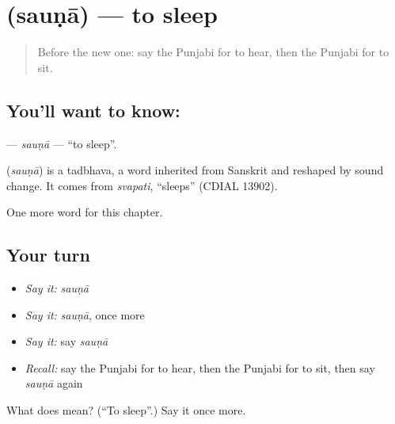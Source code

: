 \section[\texorpdfstring{\pa{ਸੌਣਾ} (sauṇā)}{ਸੌਣਾ (sauṇā)}]{ (sauṇā) — to sleep}

\label{lesson:PA-C56-sauna}



\begin{quote}
Before the new one: say the Punjabi for to hear, then the Punjabi for to sit.
\end{quote}

\subsection*{You'll want to know: }
\textbf{} — \emph{sauṇā} — \textquotedblleft{}to sleep\textquotedblright{}.

\begin{cousinweb}
\textbf{} (\emph{sauṇā}) is a tadbhava, a word inherited from Sanskrit and reshaped by sound change. It comes from \emph{svapati}, \textquotedblleft{}sleeps\textquotedblright{} (CDIAL 13902).
\end{cousinweb}

\begin{grammarlens}[title={What you've built}]
One more word for this chapter.
\end{grammarlens}

\subsection*{Your turn}
\begin{itemize}
\raggedright
  \item \emph{Say it:} \emph{sauṇā}
  \item \emph{Say it:} \emph{sauṇā}, once more
  \item \emph{Say it:} say \emph{sauṇā}
  \item \emph{Recall:} say the Punjabi for to hear, then the Punjabi for to sit, then say \emph{sauṇā} again
\end{itemize}

\begin{tcolorbox}[breakable,colback=teal!4,colframe=teal!35!black,title={Before you move on}]
What does  mean? (\textquotedblleft{}To sleep\textquotedblright{}.) Say it once more.
\end{tcolorbox}
